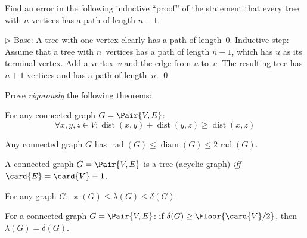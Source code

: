 \documentclass[a4paper,12pt]{article}
\newcommand{\op}[1]{\operatorname*{#1}}
\newcommand{\dist}[1]{\op{dist}(#1)}
\newcommand{\minDegree}[1]{\delta(#1)}
\newcommand{\graphRadius}[1]{\op{rad}(#1)}
\newcommand{\graphDiameter}[1]{\op{diam}(#1)}
\newcommand{\vertexConnectivity}[1]{\varkappa(#1)}
\newcommand{\edgeConnectivity}[1]{\lambda(#1)}
\begin{document}
\begin{tasks}
    \item Find an error in the following inductive \enquote{proof} of the statement that every tree with $n$ vertices has a path of length $n - 1$.

    $\triangleright$
    Base: A tree with one vertex clearly has a path of length~0.
    Inductive step: Assume that a tree with $n$~vertices has a path of length $n - 1$, which has $u$ as its terminal vertex.
    Add a vertex~$v$ and the edge from $u$ to~$v$.
    The resulting tree has $n + 1$ vertices and has a path of length~$n$.
    \qed


    \item Prove \emph{rigorously} the following theorems:

    \begin{theorem}
        For any connected graph $G = \Pair{V, E}$:
        \[
            \forall x,y,z \in V : \dist{x,y} + \dist{y,z} \geq \dist{x,z}
        \]
    \end{theorem}

    \begin{theorem}
        Any connected graph $G$ has $\graphRadius{G} \leq \graphDiameter{G} \leq 2 \graphRadius{G}$.
    \end{theorem}


    \begin{theorem}[Tree]
        A connected graph $G = \Pair{V, E}$ is a tree (\ie acyclic graph) \emph{iff} $\card{E} = \card{V} - 1$.
    \end{theorem}


    \begin{theorem}[Whitney]
        For any graph $G$: $\vertexConnectivity{G} \leq \edgeConnectivity{G} \leq \minDegree{G}$.
    \end{theorem}

    \begin{theorem}[Chartrand]
        For a connected graph $G = \Pair{V, E}$: if $\minDegree{G} \geq \Floor{\card{V} / 2}$, then $\edgeConnectivity{G} = \minDegree{G}$.
    \end{theorem}


\end{tasks}
\end{document}
